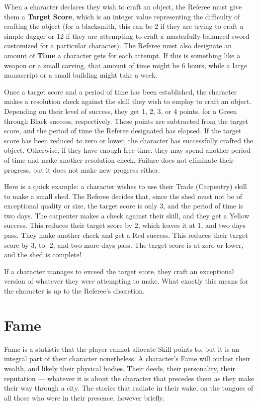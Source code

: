 \documentclass[oneside]{book}
\begin{document}
\begin{multicols}{2}
When a character declares they wish to craft an object, the Referee must give them a \textbf{Target Score}, which is an integer value representing the difficulty of crafting the object (for a blacksmith, this can be 2 if they are trying to craft a simple dagger or 12 if they are attempting to craft a masterfully-balanced sword customized for a particular character). The Referee must also designate an amount of \textbf{Time} a character gets for each attempt. If this is something like a weapon or a small carving, that amount of time might be 6 hours, while a large manuscript or a small building might take a week. 

Once a target score and a period of time has been established, the character makes a resolution check against the skill they wish to employ to craft an object. Depending on their level of success, they get 1, 2, 3, or 4 points, for a Green through Black success, respectively. These points are subtracted from the target score, and the period of time the Referee designated has elapsed. If the target score has been reduced to zero or lower, the character has successfully crafted the object. Otherwise, if they have enough free time, they may spend another period of time and make another resolution check. Failure does not eliminate their progress, but it does not make new progress either. 

Here is a quick example: a character wishes to use their Trade (Carpentry) skill to make a small shed. The Referee decides that, since the shed must not be of exceptional quality or size, the target score is only 3, and the period of time is two days. The carpenter makes a check against their skill, and they get a Yellow success. This reduces their target score by 2, which leaves it at 1, and two days pass. They make another check and get a Red success. This reduces their target score by 3, to -2, and two more days pass. The target score is at zero or lower, and the shed is complete! 

If a character manages to exceed the target score, they craft an exceptional version of whatever they were attempting to make. What exactly this means for the character is up to the Referee's discretion. 

\section{Fame}
Fame is a statistic that the player cannot allocate Skill points to, but it is an integral part of their character nonetheless. A character's Fame will outlast their wealth, and likely their physical bodies. Their deeds, their personality, their reputation --- whatever it is about the character that precedes them as they make their way through a city. The stories that radiate in their wake, on the tongues of all those who were in their presence, however briefly. 


\end{multicols}
\end{document}
